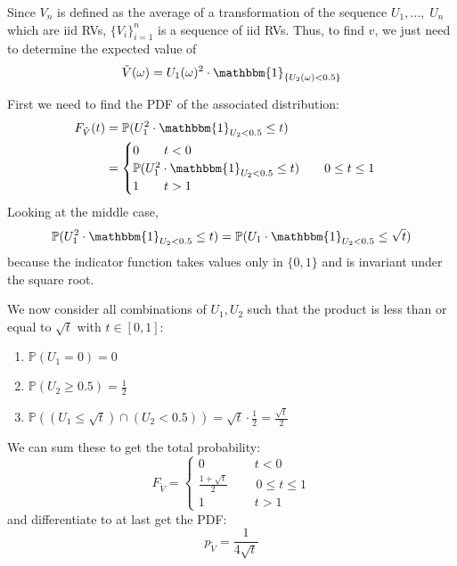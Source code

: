 \documentclass[12pt]{article}
\renewcommand{\P}{\mathbb{P}}
\newcommand{\ind}{\mathbbm{1}}
\begin{document}
        Since $V_n$ is defined as the average of a transformation of the sequence $U_1, \dots, \; U_n$ which are iid RVs, $\{V_i\}_{i=1}^n$ is a sequence of iid RVs. Thus, to find $v$, we just need to determine the expected value of
        \[\tilde V(\omega) = U_1(\omega)^2 \cdot \ind_{\{U_2(\omega) < 0.5\}}\]

        First we need to find the PDF of the associated distribution:
        \begin{align*}
            F_{\tilde V}(t) &= \P(U_1^2 \cdot \ind_{U_2 < 0.5} \leq t)\\
            &= \begin{cases}
                0 \qquad t < 0\\
                \P(U_1^2 \cdot \ind_{U_2 < 0.5} \leq t) \qquad 0 \leq t \leq 1\\
                1 \qquad t > 1
            \end{cases}
        \end{align*}
        Looking at the middle case, 
        \[\P(U_1^2 \cdot \ind_{U_2 < 0.5} \leq t) = \P(U_1 \cdot \ind_{U_2 < 0.5} \leq \sqrt t)\]
        because the indicator function takes values only in $\{0, 1\}$ and is invariant under the square root. 

        We now consider all combinations of $U_1, U_2$ such that the product is less than or equal to $\sqrt t$ with $t \in [0, 1]$:
        \begin{enumerate}
            \item $\P(U_1 = 0) = 0$       
            \item $\P(U_2 \geq 0.5) = \frac{1}{2}$ 
            \item $\P((U_1 \leq \sqrt t) \cap (U_2 < 0.5)) = \sqrt t \cdot \frac{1}{2} = \frac{\sqrt t}{2}$
        \end{enumerate}
        We can sum these to get the total probability:
        \[F_{\tilde V} = \begin{cases}
            0 \qquad\qquad t < 0\\
            \frac{1 + \sqrt t}{2} \qquad\; 0 \leq t \leq 1\\
            1 \qquad\qquad t > 1
        \end{cases}\]
        and differentiate to at last get the PDF:
        \[p_{\tilde V} = \frac{1}{4\sqrt t}\]
\end{document}
